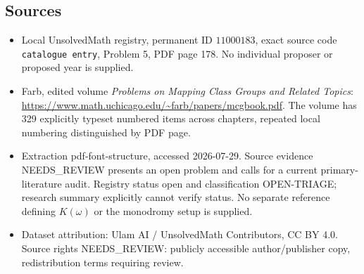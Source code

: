 \documentclass[11pt]{article}
\begin{document}
\subsection{Sources}
\begin{itemize}
\item Local UnsolvedMath registry, permanent ID \(11000183\), exact source code \texttt{catalogue entry}, Problem 5, PDF page 178. No individual proposer or proposed year is supplied.
\item Farb, edited volume \emph{Problems on Mapping Class Groups and Related Topics}: \url{https://www.math.uchicago.edu/~farb/papers/mcgbook.pdf}. The volume has 329 explicitly typeset numbered items across chapters, repeated local numbering distinguished by PDF page.
\item Extraction pdf-font-structure, accessed 2026-07-29. Source evidence NEEDS\_REVIEW presents an open problem and calls for a current primary-literature audit. Registry status open and classification OPEN-TRIAGE; research summary explicitly cannot verify status. No separate reference defining \(K(\omega)\) or the monodromy setup is supplied.
\item Dataset attribution: Ulam AI / UnsolvedMath Contributors, CC BY 4.0. Source rights NEEDS\_REVIEW: publicly accessible author/publisher copy, redistribution terms requiring review.
\end{itemize}
\end{document}
